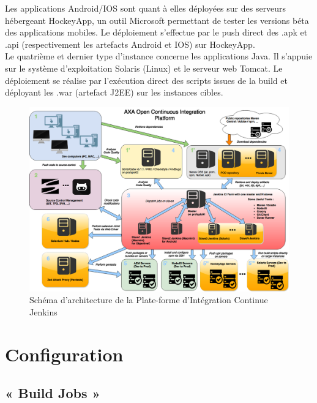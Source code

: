     Les applications Android/IOS sont quant à elles déployées sur des serveurs hébergeant HockeyApp, un outil Microsoft permettant de tester les versions béta des applications mobiles. Le déploiement s'effectue par le push direct des .apk et .api (respectivement les artefacts Android et IOS) sur HockeyApp.\\

    Le quatrième et dernier type d'instance concerne les applications Java. Il s'appuie sur le système d'exploitation Solaris (Linux) et le serveur web Tomcat. Le déploiement se réalise par l'exécution direct des scripts issues de la build et déployant les .war (artefact J2EE) sur les instances cibles.

    \begin{figure}
      \begin{center}
        \includegraphics[scale=0.5]{images/PICJenkins.png}
      \end{center}
      \caption{Schéma d'architecture de la Plate-forme d'Intégration Continue Jenkins}
      \label{PICJenkins}
    \end{figure}

  \section{Configuration}

    \subsection{« Build Jobs »}

